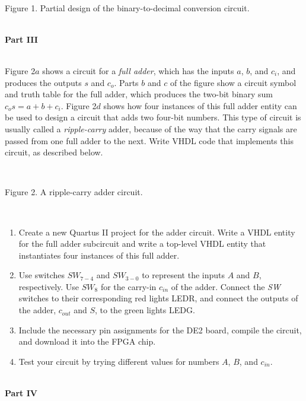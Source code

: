 \documentclass[psfig,10pt,fullpage]{article}
\begin{document}
\begin{figure}[H]
\scriptsize
\centerline{
\hbox{}}
\end{figure}
~\\
\centerline{Figure 1.  Partial design of the binary-to-decimal conversion circuit.}

~\\
\noindent
{\bf Part III}

~\\
Figure 2$a$ shows a circuit for a {\it full adder}, which has the inputs $a$, $b$, and $c_i$,
and produces the outputs $s$ and $c_o$. Parts $b$ and $c$ of the figure show a circuit
symbol and truth table for the full adder, which produces the two-bit binary sum
$c_o s = a + b + c_i$. Figure 2$d$ shows how four instances of this full adder entity
can be used to design a circuit that adds two four-bit numbers. This type of circuit is
usually called a {\it ripple-carry} adder, because of the way that the carry signals are 
passed from one full adder to the next. Write VHDL code that implements this circuit,
as described below.

\begin{figure}[H]
\scriptsize
\centerline{
\hbox{}}
\end{figure}
~\\
\centerline{Figure 2.  A ripple-carry adder circuit.}
~\\

\begin{enumerate}
\item Create a new Quartus II project for the adder circuit. Write a VHDL entity
for the full adder subcircuit and write a top-level VHDL entity that instantiates four 
instances of this full adder.
\item Use switches $SW_{7-4}$ and $SW_{3-0}$ to represent the inputs $A$ and $B$, respectively.
Use $SW_{8}$ for the carry-in $c_{in}$ of the adder. Connect the {\it SW} switches to
their corresponding red lights LEDR, and connect the outputs of the adder, $c_{out}$ and
$S$, to the green lights LEDG.
\item Include the necessary pin assignments for the DE2 board, compile the circuit, and
download it into the FPGA chip.
\item Test your circuit by trying different values for numbers $A$, $B$, and $c_{in}$.
\end{enumerate}

~\\
\noindent
{\bf Part IV}
\end{document}
